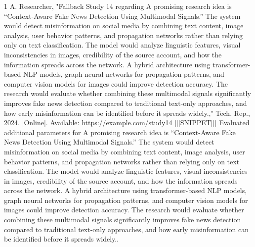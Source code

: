 \documentclass[conference]{IEEEtran}
\begin{document}
\begin{thebibliography}{1}
A. Researcher, "Fallback Study 14 regarding A promising research idea is “Context-Aware Fake News Detection Using Multimodal Signals.” The system would detect misinformation on social media by combining text content, image analysis, user behavior patterns, and propagation networks rather than relying only on text classification. The model would analyze linguistic features, visual inconsistencies in images, credibility of the source account, and how the information spreads across the network. A hybrid architecture using transformer-based NLP models, graph neural networks for propagation patterns, and computer vision models for images could improve detection accuracy. The research would evaluate whether combining these multimodal signals significantly improves fake news detection compared to traditional text-only approaches, and how early misinformation can be identified before it spreads widely.," Tech. Rep., 2024. [Online]. Available: https://example.com/study14 |||SNIPPET||| Evaluated additional parameters for A promising research idea is “Context-Aware Fake News Detection Using Multimodal Signals.” The system would detect misinformation on social media by combining text content, image analysis, user behavior patterns, and propagation networks rather than relying only on text classification. The model would analyze linguistic features, visual inconsistencies in images, credibility of the source account, and how the information spreads across the network. A hybrid architecture using transformer-based NLP models, graph neural networks for propagation patterns, and computer vision models for images could improve detection accuracy. The research would evaluate whether combining these multimodal signals significantly improves fake news detection compared to traditional text-only approaches, and how early misinformation can be identified before it spreads widely..

\end{thebibliography}
\end{document}
